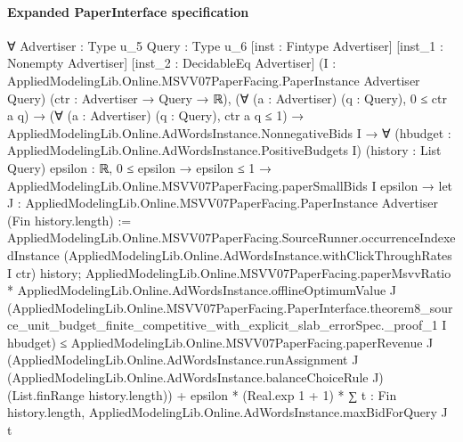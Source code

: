 \documentclass[10pt]{article}
\begin{document}
\paragraph{Expanded PaperInterface specification}
\begin{ReviewVerbatim}
∀ {Advertiser : Type u_5} {Query : Type u_6} [inst : Fintype Advertiser] [inst_1 : Nonempty Advertiser]
  [inst_2 : DecidableEq Advertiser] (I : AppliedModelingLib.Online.MSVV07PaperFacing.PaperInstance Advertiser Query)
  (ctr : Advertiser → Query → ℝ),
  (∀ (a : Advertiser) (q : Query), 0 ≤ ctr a q) →
    (∀ (a : Advertiser) (q : Query), ctr a q ≤ 1) →
      AppliedModelingLib.Online.AdWordsInstance.NonnegativeBids I →
        ∀ (hbudget : AppliedModelingLib.Online.AdWordsInstance.PositiveBudgets I) (history : List Query) {epsilon : ℝ},
          0 ≤ epsilon →
            epsilon ≤ 1 →
              AppliedModelingLib.Online.MSVV07PaperFacing.paperSmallBids I epsilon →
                let J : AppliedModelingLib.Online.MSVV07PaperFacing.PaperInstance Advertiser (Fin history.length) :=
                  AppliedModelingLib.Online.MSVV07PaperFacing.SourceRunner.occurrenceIndexedInstance
                    (AppliedModelingLib.Online.AdWordsInstance.withClickThroughRates I ctr) history;
                AppliedModelingLib.Online.MSVV07PaperFacing.paperMsvvRatio *
                    AppliedModelingLib.Online.AdWordsInstance.offlineOptimumValue J
                      (AppliedModelingLib.Online.MSVV07PaperFacing.PaperInterface.theorem8_source_unit_budget_finite_competitive_with_explicit_slab_errorSpec._proof_1
                        I hbudget) ≤
                  AppliedModelingLib.Online.MSVV07PaperFacing.paperRevenue J
                      (AppliedModelingLib.Online.AdWordsInstance.runAssignment J
                        (AppliedModelingLib.Online.AdWordsInstance.balanceChoiceRule J)
                        (List.finRange history.length)) +
                    epsilon * (Real.exp 1 + 1) *
                      ∑ t : Fin history.length, AppliedModelingLib.Online.AdWordsInstance.maxBidForQuery J t
\end{ReviewVerbatim}
\end{document}

